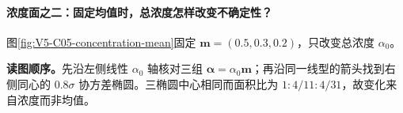 \documentclass[UTF8,a4paper,11pt,openany]{ctexbook}
\begin{document}
\setcounter{page}{666}
\setcounter{chapter}{34}
\setcounter{section}{5}
\setcounter{figure}{8}
\setcounter{equation}{22}
\pagestyle{headings}
\paragraph{浓度面之二：固定均值时，总浓度怎样改变不确定性？}
图\ref{fig:V5-C05-concentration-mean}固定 $\boldsymbol m=(0.5,0.3,0.2)$，只改变总浓度 $\alpha_0$。

\FloatBarrier
\noindent\textbf{读图顺序。}先沿左侧线性 $\alpha_0$ 轴核对三组 $\boldsymbol\alpha=\alpha_0\boldsymbol m$；再沿同一线型的箭头找到右侧同心的 $0.8\sigma$ 协方差椭圆。三椭圆中心相同而面积比为 $1:4/11:4/31$，故变化来自浓度而非均值。\par
\end{document}
